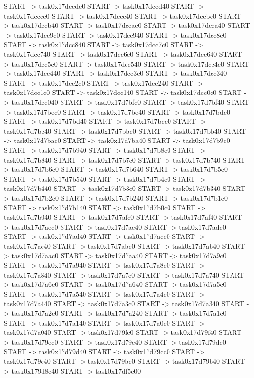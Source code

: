 {	START -> task0x17dccdc0
	START -> task0x17dccd40
	START -> task0x17dcccc0
	START -> task0x17dccc40
	START -> task0x17dccbc0
	START -> task0x17dccb40
	START -> task0x17dccac0
	START -> task0x17dcca40
	START -> task0x17dcc9c0
	START -> task0x17dcc940
	START -> task0x17dcc8c0
	START -> task0x17dcc840
	START -> task0x17dcc7c0
	START -> task0x17dcc740
	START -> task0x17dcc6c0
	START -> task0x17dcc640
	START -> task0x17dcc5c0
	START -> task0x17dcc540
	START -> task0x17dcc4c0
	START -> task0x17dcc440
	START -> task0x17dcc3c0
	START -> task0x17dcc340
	START -> task0x17dcc2c0
	START -> task0x17dcc240
	START -> task0x17dcc1c0
	START -> task0x17dcc140
	START -> task0x17dcc0c0
	START -> task0x17dcc040
	START -> task0x17d7bfc0
	START -> task0x17d7bf40
	START -> task0x17d7bec0
	START -> task0x17d7be40
	START -> task0x17d7bdc0
	START -> task0x17d7bd40
	START -> task0x17d7bcc0
	START -> task0x17d7bc40
	START -> task0x17d7bbc0
	START -> task0x17d7bb40
	START -> task0x17d7bac0
	START -> task0x17d7ba40
	START -> task0x17d7b9c0
	START -> task0x17d7b940
	START -> task0x17d7b8c0
	START -> task0x17d7b840
	START -> task0x17d7b7c0
	START -> task0x17d7b740
	START -> task0x17d7b6c0
	START -> task0x17d7b640
	START -> task0x17d7b5c0
	START -> task0x17d7b540
	START -> task0x17d7b4c0
	START -> task0x17d7b440
	START -> task0x17d7b3c0
	START -> task0x17d7b340
	START -> task0x17d7b2c0
	START -> task0x17d7b240
	START -> task0x17d7b1c0
	START -> task0x17d7b140
	START -> task0x17d7b0c0
	START -> task0x17d7b040
	START -> task0x17d7afc0
	START -> task0x17d7af40
	START -> task0x17d7aec0
	START -> task0x17d7ae40
	START -> task0x17d7adc0
	START -> task0x17d7ad40
	START -> task0x17d7acc0
	START -> task0x17d7ac40
	START -> task0x17d7abc0
	START -> task0x17d7ab40
	START -> task0x17d7aac0
	START -> task0x17d7aa40
	START -> task0x17d7a9c0
	START -> task0x17d7a940
	START -> task0x17d7a8c0
	START -> task0x17d7a840
	START -> task0x17d7a7c0
	START -> task0x17d7a740
	START -> task0x17d7a6c0
	START -> task0x17d7a640
	START -> task0x17d7a5c0
	START -> task0x17d7a540
	START -> task0x17d7a4c0
	START -> task0x17d7a440
	START -> task0x17d7a3c0
	START -> task0x17d7a340
	START -> task0x17d7a2c0
	START -> task0x17d7a240
	START -> task0x17d7a1c0
	START -> task0x17d7a140
	START -> task0x17d7a0c0
	START -> task0x17d7a040
	START -> task0x17d79fc0
	START -> task0x17d79f40
	START -> task0x17d79ec0
	START -> task0x17d79e40
	START -> task0x17d79dc0
	START -> task0x17d79d40
	START -> task0x17d79cc0
	START -> task0x17d79c40
	START -> task0x17d79bc0
	START -> task0x17d79b40
	START -> task0x179d8c40
	START -> task0x17df5c00
}
